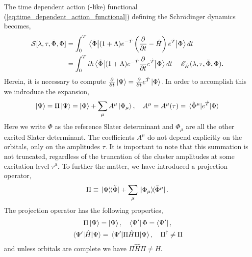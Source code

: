 The time dependent action (-like) functional (\autoref{eq:time_dependent_action_functional}) 
defining the Schrödinger dynamics becomes,
\begin{equation}
    \begin{aligned}
        \label{eq:oatdcc_functional}
        \mathcal{S}[\lambda, \tau, \tilde{\Phi}, \Phi]
        &= \int_0^T \mel{\tilde{\Phi}}
            {(1 + \Lambda)e^{-\hat{T}}\left(\frac{\partial}{\partial t} - \hat{H} \right)e^{\hat{T}}} 
            {\Phi} dt \\ 
        &= \int_0^T i\hbar\mel{\tilde{\Phi}}
        {(1 + \Lambda)e^{-\hat{T}}\frac{\partial}{\partial t}e^{\hat{T}}}
        {\Phi} dt
        - \mathscr{E}_{\hat{H}}(\lambda, \tau, \tilde{\Phi}, \Phi).
    \end{aligned} 
\end{equation}
Herein, it is necessary to compute 
$\frac{\partial}{\partial t}\ket{\Psi} = \frac{\partial}{\partial t}e^{\hat{T}}\ket{\Phi}$.
In order to accomplish this we indroduce the expansion,
\begin{equation}
    \ket{\Psi} = \Pi\ket{\Psi} = \ket{\Phi} + \sum_\mu A^\mu \ket{\Phi_\mu}, \quad
    A^\mu = A^\mu(\tau) = \mel*{\tilde{\Phi}^\mu}{e^{\hat{T}}}{\Phi}
\end{equation}
Here we write $\Phi$ as the reference Slater determinant and $\Phi_\mu$ are all the other 
excited Slater determinant. The coefficients $A^\mu$ do not depend explicitly on the 
orbitals, only on the amplitudes $\tau$. It is important to note that this summation is not truncated,
regardless of the truncation of the cluster amplitudes at some excitation level $\tau^\mu$.
To further the matter, we have introduced a projection operator,
\begin{equation}
    \Pi \equiv \outerproduct*{\Phi}{\tilde{\Phi}} 
    + \sum_\mu \outerproduct*{\Phi_\mu}{\tilde{\Phi}^\mu}.
\end{equation}
The projection operator has the following properties,
\begin{equation}
    \begin{gathered}
        \Pi \ket{\Psi} = \ket{\Psi}, \quad \bra{\Psi'}\Phi = \bra{\Psi'}, \\
        \mel{\Psi'}{\hat{H}}{\Psi} = \mel{\Psi'}{\Pi\hat{H}\Pi}{\Psi},
        \quad \Pi^\dagger \neq \Pi
    \end{gathered}
\end{equation}
and unless orbitals are complete we have $\Pi\hat{H}\Pi \neq \hat{H}$.

